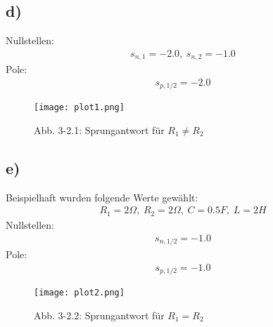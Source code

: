 \documentclass[11pt]{scrartcl} %
\begin{document}
\subsection*{d)}
Nullstellen:
\begin{align*}
	s_{n,1}=-2.0,\hspace{3pt}s_{n,2}=-1.0
\end{align*}
Pole:
\begin{align*}
	s_{p,1/2}=-2.0
\end{align*}
\begin{figure}[H]
	\centering
	\texttt{[image: plot1.png]}
	\captionsetup{labelformat=empty}
	\caption{Abb. 3-2.1: Sprungantwort für $R_1\neq R_2$}
\end{figure}
\subsection*{e)}
Beispielhaft wurden folgende Werte gewählt:
\begin{align*}
	R_1=2\Omega,\hspace{3pt}R_2=2\Omega,\hspace{3pt}C=0.5F,\hspace{3pt}L=2H
\end{align*}
Nullstellen:
\begin{align*}
	s_{n,1/2}=-1.0
\end{align*}
Pole:
\begin{align*}
	s_{p,1/2}=-1.0
\end{align*}
\begin{figure}[H]
	\centering
	\texttt{[image: plot2.png]}
	\captionsetup{labelformat=empty}
	\caption{Abb. 3-2.2: Sprungantwort für $R_1=R_2$}
\end{figure}
\end{document}
